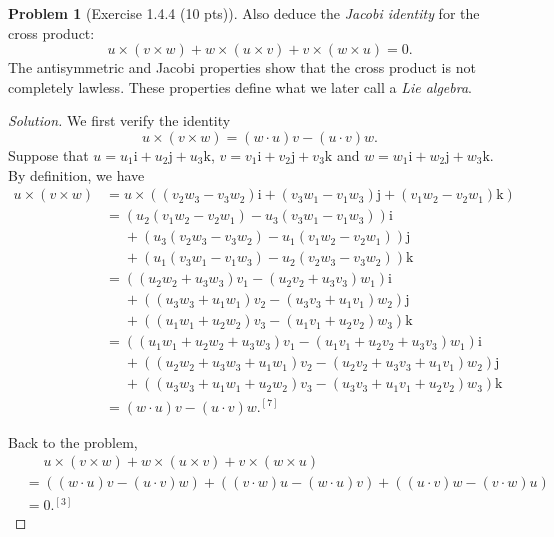 \documentclass{article}
\theoremstyle{definition}
\newtheorem{problem}{Problem}
\theoremstyle{plain}
\begin{document}
\begin{problem}[Exercise 1.4.4 (10 pts)]
Also deduce the \emph{Jacobi identity} for the cross product:
\begin{displaymath}
u\times(v\times w)+w\times(u\times v)+v\times(w\times u)=0.
\end{displaymath}
The antisymmetric and Jacobi properties show that the cross product is not completely lawless. These properties define what we later call a \emph{Lie algebra}.
\end{problem}
\begin{adjustwidth}{0.7cm}{}
\color{blue}
\begin{proof}[Solution]We first verify the identity
\begin{displaymath}
u\times(v\times w)=(w\cdot u)v-(u\cdot v)w.
\end{displaymath}
Suppose that $u=u_1\bm{\mathrm{i}}+u_2\bm{\mathrm{j}}+u_3\bm{\mathrm{k}}$, $v=v_1\bm{\mathrm{i}}+v_2\bm{\mathrm{j}}+v_3\bm{\mathrm{k}}$ and $w=w_1\bm{\mathrm{i}}+w_2\bm{\mathrm{j}}+w_3\bm{\mathrm{k}}$. By definition, we have
\begin{align*}
u\times(v\times w)&=u\times((v_2w_3-v_3w_2)\bm{\mathrm{i}}+(v_3w_1-v_1w_3)\bm{\mathrm{j}}+(v_1w_2-v_2w_1)\bm{\mathrm{k}})\\
&=(u_2(v_1w_2-v_2w_1)-u_3(v_3w_1-v_1w_3))\bm{\mathrm{i}}\\
&\phantom{=}+(u_3(v_2w_3-v_3w_2)-u_1(v_1w_2-v_2w_1))\bm{\mathrm{j}}\\
&\phantom{=}+(u_1(v_3w_1-v_1w_3)-u_2(v_2w_3-v_3w_2))\bm{\mathrm{k}}\\
&=((u_2w_2+u_3w_3)v_1-(u_2v_2+u_3v_3)w_1)\bm{\mathrm{i}}\\
&\phantom{=}+((u_3w_3+u_1w_1)v_2-(u_3v_3+u_1v_1)w_2)\bm{\mathrm{j}}\\
&\phantom{=}+((u_1w_1+u_2w_2)v_3-(u_1v_1+u_2v_2)w_3)\bm{\mathrm{k}}\\
&=((u_1w_1+u_2w_2+u_3w_3)v_1-(u_1v_1+u_2v_2+u_3v_3)w_1)\bm{\mathrm{i}}\\
&\phantom{=}+((u_2w_2+u_3w_3+u_1w_1)v_2-(u_2v_2+u_3v_3+u_1v_1)w_2)\bm{\mathrm{j}}\\
&\phantom{=}+((u_3w_3+u_1w_1+u_2w_2)v_3-(u_3v_3+u_1v_1+u_2v_2)w_3)\bm{\mathrm{k}}\\
&=(w\cdot u)v-(u\cdot v)w.^{[7]}
\end{align*}\par
Back to the problem,
\begin{align*}
&\phantom{=}u\times(v\times w)+w\times(u\times v)+v\times(w\times u)\\
&=((w\cdot u)v-(u\cdot v)w)+((v\cdot w)u-(w\cdot u)v)+((u\cdot v)w-(v\cdot w)u)\\
&=0.^{[3]}
\end{align*}
\end{proof}
\color{black}
\end{adjustwidth}
~\par
\end{document}
